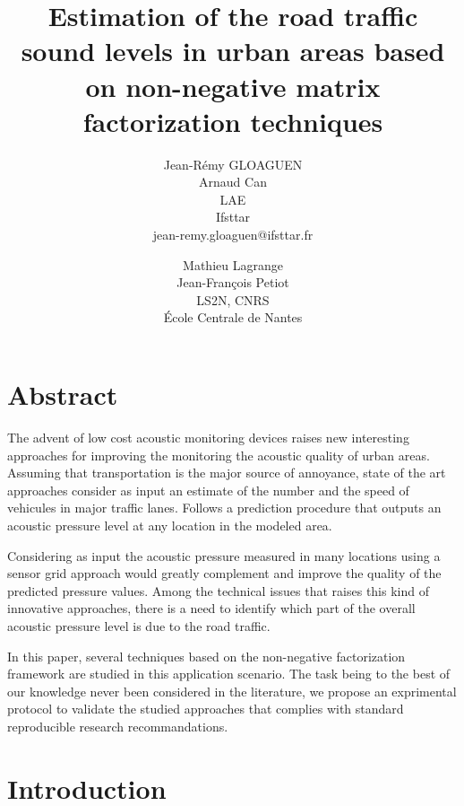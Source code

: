 \documentclass[twocolumn,a4paper,10pt]{article}
\title{Estimation of the road traffic sound levels in urban areas based on non-negative matrix factorization techniques}
\author{
    Jean-Rémy GLOAGUEN\\
    Arnaud Can\\
    LAE\\
    Ifsttar\\
    jean-remy.gloaguen@ifsttar.fr
  \and
    Mathieu Lagrange\\
	Jean-François Petiot \\
    LS2N, CNRS\\
    \'Ecole Centrale de  Nantes\\
}
\date{}
\begin{document}
\maketitle

\section*{Abstract}

The advent of low cost acoustic monitoring devices raises new interesting approaches for improving the monitoring the acoustic quality of urban areas. Assuming that transportation is the major source of annoyance, state of the art approaches consider as input an estimate of the number and the speed of vehicules in major traffic lanes. Follows a prediction procedure that outputs an acoustic pressure level at any location in the modeled area.

Considering as input the acoustic pressure measured in many locations using a sensor grid approach would greatly complement and improve the quality of the predicted pressure values. Among the technical issues that raises this kind of innovative approaches, there is a need to identify which part of the overall acoustic pressure level is due to the road traffic.

In this paper, several techniques based on the non-negative factorization framework are studied in this application scenario. The task being to the best of our knowledge never been considered in the literature, we propose an exprimental protocol to validate the studied approaches that complies with standard reproducible research recommandations.

\section{Introduction}
\end{document}
